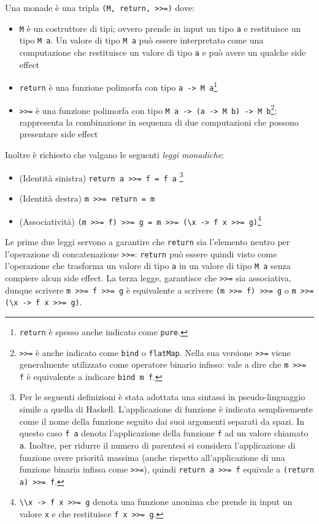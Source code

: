Una monade è una tripla \lstinline{(M, return, >>=)} dove:
\begin{itemize}
  \item \lstinline{M} è un costruttore di tipi; ovvero prende in input un tipo \lstinline{a} e restituisce un tipo \lstinline{M a}. Un valore di tipo \lstinline{M a} può essere interpretato come una computazione che restituisce un valore di tipo \lstinline{a} e può avere un qualche side effect
  \item \lstinline{return} è una funzione polimorfa con tipo \lstinline{a -> M a}\footnote{\lstinline{return} è spesso anche indicato come \lstinline{pure}.}
  \item \lstinline{>>=} è una funzione polimorfa con tipo \lstinline{M a -> (a -> M b) -> M b}\footnote{\lstinline{>>=} è anche indicato come \lstinline{bind} o \lstinline{flatMap}. Nella sua versione \lstinline{>>=} viene generalmente utilizzato come operatore binario infisso: vale a dire che \lstinline{m >>= f} è equivalente a indicare \lstinline{bind m f}.}; rappresenta la combinazione in sequenza di due computazioni che possono presentare side effect
\end{itemize}
Inoltre è richiesto che valgano le seguenti \emph{leggi monadiche}:
\begin{itemize}
  \item (Identità sinistra) \lstinline{return a >>= f = f a}
        \footnote{Per le seguenti definizioni è stata adottata una sintassi in pseudo-linguaggio simile a quella di Haskell. L'applicazione di funzione è indicata semplicemente come il nome della funzione seguito dai suoi argomenti separati da spazi. In questo caso \lstinline{f a} denota l'applicazione della funzione \lstinline{f} ad un valore chiamato \lstinline{a}. Inoltre, per ridurre il numero di parentesi si considera l'applicazione di funzione avere priorità massima (anche rispetto all'applicazione di una funzione binaria infissa come \lstinline{>>=}), quindi \lstinline{return a >>= f} equivale a \lstinline{(return a) >>= f}.}
  \item (Identità destra) \lstinline{m >>= return = m}
  \item (Associatività) \lstinline{(m >>= f) >>= g = m >>= (\x -> f x >>= g)}\footnote{\lstinline{\\x -> f x >>= g} denota una funzione anonima che prende in input un valore \lstinline{x} e che restituisce \lstinline{f x >>= g}.}
\end{itemize}
Le prime due leggi servono a garantire che \lstinline{return} sia l'elemento neutro per l'operazione di concatenazione \lstinline{>>=}: \lstinline{return} può essere quindi visto come l'operazione che trasforma un valore di tipo \lstinline{a} in un valore di tipo \lstinline{M a} senza compiere alcun side effect.
La terza legge, garantisce che \lstinline{>>=} sia associativa, dunque scrivere \lstinline{m >>= f >>= g} è equivalente a scrivere \lstinline{(m >>= f) >>= g} o \lstinline{m >>= (\x -> f x >>= g)}.

